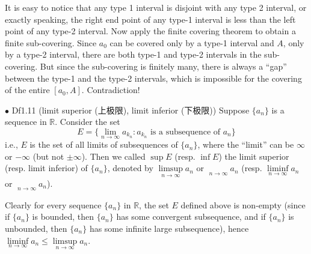 \documentclass{article}
\begin{document}
\begin{Rmk}{}
\begin{compactenum}
    \end{compactenum}
    It is easy to notice that any type 1 interval is disjoint with any type 2 interval, or exactly speaking, the right end point of any type-1 interval is less than the left point of any type-2 interval. Now apply the finite covering theorem to obtain a finite sub-covering. Since $a_0$ can be covered only by a type-1 interval and $A$, only by a type-2 interval, there are both type-1 and type-2 intervals in the sub-covering. But since the sub-covering is finitely many, there is always a ``gap'' between the type-1 and the type-2 intervals, which is impossible for the covering of the entire $[a_0, A]$. Contradiction!
\end{Rmk}

\begin{Df}{$\bullet$ Df1.11 (limit superior (上极限), limit inferior (下极限))}
    Suppose $\{a_n\}$ is a sequence in $\mathbb{R}$. Consider the set
    $$ E = \{\lim\limits_{n\to\infty} a_{k_n}: a_{k_n} \text{ is a subsequence of } a_n\} $$
    i.e., $E$ is the set of all limits of subsequences of $\{a_n\}$, where the ``limit'' can be $\infty$ or $-\infty$ (but not $\pm\infty$). Then we called $\sup E$ (resp. $\inf E$) the limit superior (resp. limit inferior) of $\{a_n\}$, denoted by $\limsup\limits_{n\to\infty}a_n$ or $\mathop{\overline{\lim}}\limits_{n\to\infty} a_n$ (resp. $\liminf\limits_{n\to\infty}a_n$ or $\mathop{\underline{\lim}}\limits_{n\to\infty} a_n$).
\end{Df}

\begin{Rmk}{}
    \textcolor{Th}{Clearly for every sequence $\{a_n\}$ in $\mathbb{R}$, the set $E$ defined above is non-empty} (since if $\{a_n\}$ is bounded, then $\{a_n\}$ has some convergent subsequence, and if $\{a_n\}$ is unbounded, then $\{a_n\}$ has some infinite large subsequence), \textcolor{Th}{hence $\liminf\limits_{n\to\infty}a_n\leq \limsup\limits_{n\to\infty}a_n$.}
\end{Rmk}
\end{document}
